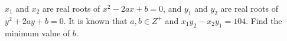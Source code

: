 $x_1$ and $x_2$ are real roots of $x^2-2ax+b=0$, and $y_1$ and $y_2$ are real roots of $y^2+2ay+b=0$. It is known that $a, b \in Z^+$ and $x_1y_2-x_2y_1=104$. Find the minimum value of $b$.
